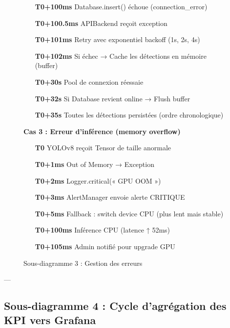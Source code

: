 \begin{figure}[H]
{\begin{minipage}{0.95\textwidth}
    \begin{enumerate}
        \item[\textbf{T0+100ms}] Database.insert() échoue (connection\_error)
        \item[\textbf{T0+100.5ms}] APIBackend reçoit exception
        \item[\textbf{T0+101ms}] Retry avec exponentiel backoff (1s, 2s, 4s)
        \item[\textbf{T0+102ms}] Si échec → Cache les détections en mémoire (buffer)
        \item[\textbf{T0+30s}] Pool de connexion réessaie
        \item[\textbf{T0+32s}] Si Database revient online → Flush buffer
        \item[\textbf{T0+35s}] Toutes les détections persistées (ordre chronologique)
    \end{enumerate}
    
    \vspace{0.3cm}
    
    \textbf{Cas 3 : Erreur d'inférence (memory overflow)}
    
    \begin{enumerate}
        \item[\textbf{T0}] YOLOv8 reçoit Tensor de taille anormale
        \item[\textbf{T0+1ms}] Out of Memory → Exception
        \item[\textbf{T0+2ms}] Logger.critical(« GPU OOM »)
        \item[\textbf{T0+3ms}] AlertManager envoie alerte CRITIQUE
        \item[\textbf{T0+5ms}] Fallback : switch device CPU (plus lent mais stable)
        \item[\textbf{T0+100ms}] Inférence CPU (latence ↑ 52ms)
        \item[\textbf{T0+105ms}] Admin notifié pour upgrade GPU
    \end{enumerate}
    
    \end{minipage}}
    \caption{Sous-diagramme 3 : Gestion des erreurs}
    \label{fig:seq-error-handling}
\end{figure}

---

\subsection{Sous-diagramme 4 : Cycle d'agrégation des KPI vers Grafana}

